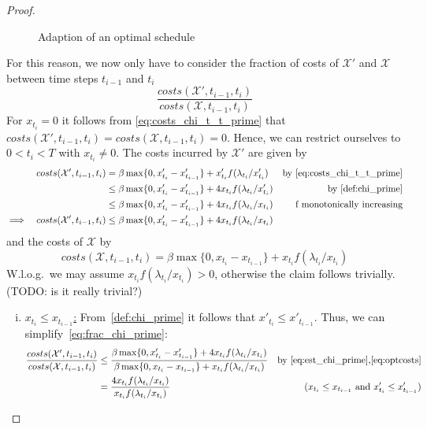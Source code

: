 \documentclass[hidelinks]{article}
\theoremstyle{plain}
\theoremstyle{definition}
\theoremstyle{rem}
\newcommand{\mx}{\mathcal{X}}
\begin{document}
\begin{proof}
\begin{enumerate}
\begin{figure}[H]
 	\caption{Adaption of an optimal schedule}
	\label{fig:adaption-schedule}
\end{figure}
	For this reason, we now only have to consider the fraction of costs of $\mx'$ and $\mx$ between time steps $t_{i-1}$ and $t_i$
	\begin{equation}
		\frac{costs(\mx',t_{i-1},t_i)}{costs(\mx,t_{i-1},t_i)}\label{eq:frac_chi_prime}
	\end{equation}
	For $x_{t_i}=0$ it follows from \eqref{eq:costs_chi_t_t_prime} that $costs(\mx',t_{i-1},t_i)=costs(\mx,t_{i-1},t_i)=0$. Hence, we can restrict ourselves to $0<t_i<T$ with $x_{t_i}\neq 0$.
	The costs incurred by $\mx'$ are given by
	\begin{align}
		&&costs(\mx',t_{i-1},t_i)&=\beta\max\{0,x'_{t_i}-x'_{t_{i-1}}\}+x'_{t_i}f(\lambda_{t_i}/x'_{t_i})&\text{by \eqref{eq:costs_chi_t_t_prime}}\nonumber\\
		&&&\le\beta\max\{0,x'_{t_i}-x'_{t_{i-1}}\}+4x_{t_i}f(\lambda_{t_i}/x'_{t_i})&\text{by \eqref{def:chi_prime}}\nonumber\\
		&&&\le\beta\max\{0,x'_{t_i}-x'_{t_{i-1}}\}+4x_{t_i}f(\lambda_{t_i}/x_{t_i})&\text{f monotonically increasing}\nonumber\\
		\implies&&costs(\mx',t_{i-1},t_i)&\le\beta\max\{0,x'_{t_i}-x'_{t_{i-1}}\}+4x_{t_i}f(\lambda_{t_i}/x_{t_i})\label{eq:est_chi_prime}
	\end{align}
	and the costs of $\mx$ by
	\begin{equation}
		costs(\mx,t_{i-1},t_i)=\beta\max\{0,x_{t_i}-x_{t_{i-1}}\}+x_{t_i}f(\lambda_{t_i}/x_{t_i})\label{eq:optcosts}
	\end{equation}
	W.l.o.g.\ we may assume $x_{t_i}f(\lambda_{t_i}/x_{t_i})>0$, otherwise the claim follows trivially. (TODO: is it really trivial?)
	\begin{enumerate}[(i)]
		\item\label{pr:4appr_1} \underline{$x_{t_i}\le x_{t_{i-1}}$:}
			From~\eqref{def:chi_prime} it follows that $x'_{t_i}\le x'_{t_{i-1}}$. Thus, we can simplify~\eqref{eq:frac_chi_prime}:
		\begin{align*}
			\frac{costs(\mx',t_{i-1},t_i)}{costs(\mx,t_{i-1},t_i)}&\le\frac{\beta\max\{0,x'_{t_i}-x'_{t_{i-1}}\}+4x_{t_i}f(\lambda_{t_i}/x_{t_i})}{\beta\max\{0,x_{t_i}-x_{t_{i-1}}\}+x_{t_i}f(\lambda_{t_i}/x_{t_i})}&\text{by \eqref{eq:est_chi_prime},\eqref{eq:optcosts}}\\
			&=\frac{4x_{t_i}f(\lambda_{t_i}/x_{t_i})}{x_{t_i}f(\lambda_{t_i}/x_{t_i})}&\text{($x_{t_i}\le x_{t_{i-1}}$ and $x'_{t_i}\le x'_{t_{i-1}}$)}\\

\end{align*}
\end{enumerate}
\end{enumerate}
\end{proof}
\end{document}
